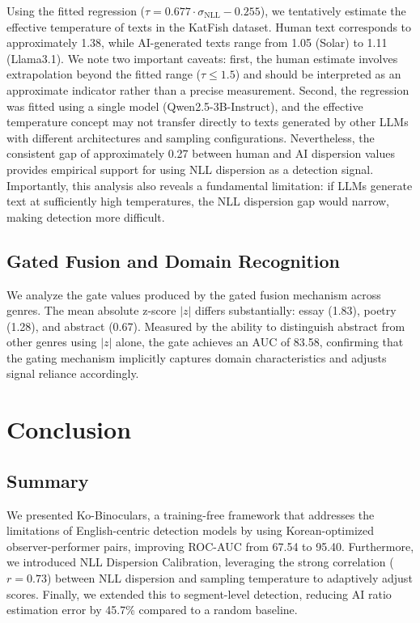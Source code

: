 \documentclass{article}
\begin{document}
Using the fitted regression ($\tau = 0.677 \cdot \sigma_{\mathrm{NLL}} - 0.255$), we tentatively estimate the effective temperature of texts in the KatFish dataset. Human text corresponds to approximately 1.38, while AI-generated texts range from 1.05 (Solar) to 1.11 (Llama3.1). We note two important caveats: first, the human estimate involves extrapolation beyond the fitted range ($\tau \leq 1.5$) and should be interpreted as an approximate indicator rather than a precise measurement. Second, the regression was fitted using a single model (Qwen2.5-3B-Instruct), and the effective temperature concept may not transfer directly to texts generated by other LLMs with different architectures and sampling configurations. Nevertheless, the consistent gap of approximately 0.27 between human and AI dispersion values provides empirical support for using NLL dispersion as a detection signal. Importantly, this analysis also reveals a fundamental limitation: if LLMs generate text at sufficiently high temperatures, the NLL dispersion gap would narrow, making detection more difficult.

\subsection{Gated Fusion and Domain Recognition}

We analyze the gate values produced by the gated fusion mechanism across genres. The mean absolute z-score $|z|$ differs substantially: essay (1.83), poetry (1.28), and abstract (0.67). Measured by the ability to distinguish abstract from other genres using $|z|$ alone, the gate achieves an AUC of 83.58, confirming that the gating mechanism implicitly captures domain characteristics and adjusts signal reliance accordingly.

\section{Conclusion}

\subsection{Summary}

We presented Ko-Binoculars, a training-free framework that addresses the limitations of English-centric detection models by using Korean-optimized observer-performer pairs, improving ROC-AUC from 67.54 to 95.40. Furthermore, we introduced NLL Dispersion Calibration, leveraging the strong correlation ($r=0.73$) between NLL dispersion and sampling temperature to adaptively adjust scores. Finally, we extended this to segment-level detection, reducing AI ratio estimation error by 45.7\% compared to a random baseline.
\end{document}

